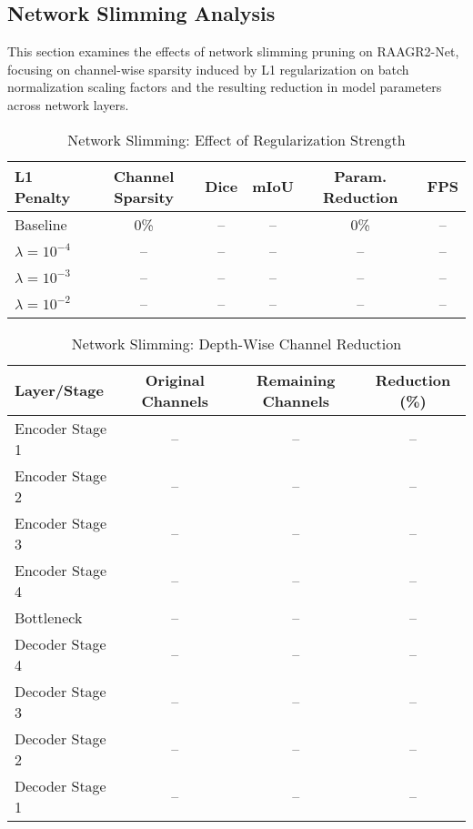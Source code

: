 \documentclass[12pt,a4paper]{article}
\begin{document}
\subsection{Network Slimming Analysis}
This section examines the effects of network slimming pruning on RAAGR2-Net, focusing on channel-wise sparsity induced by L1 regularization on batch normalization scaling factors and the resulting reduction in model parameters across network layers.

\begin{table}[htbp]
\centering
\caption{Network Slimming: Effect of Regularization Strength}
\label{tab:network_slimming_reg}
\begin{adjustbox}{width=\textwidth,center}
\begin{tabular}{lccccc}
\toprule
\textbf{L1 Penalty} & \textbf{Channel Sparsity} & \textbf{Dice} & \textbf{mIoU} & \textbf{Param. Reduction} & \textbf{FPS} \\
\midrule
Baseline & 0\% & -- & -- & 0\% & -- \\
$\lambda=10^{-4}$ & -- & -- & -- & -- & -- \\
$\lambda=10^{-3}$ & -- & -- & -- & -- & -- \\
$\lambda=10^{-2}$ & -- & -- & -- & -- & -- \\
\bottomrule
\end{tabular}
\end{adjustbox}
\end{table}

\begin{table}[htbp]
\centering
\caption{Network Slimming: Depth-Wise Channel Reduction}
\label{tab:slimming_depth_reduction}
\begin{adjustbox}{width=\textwidth,center}
\begin{tabular}{lccc}
\toprule
\textbf{Layer/Stage} & \textbf{Original Channels} & \textbf{Remaining Channels} & \textbf{Reduction (\%)} \\
\midrule
Encoder Stage 1 & -- & -- & -- \\
Encoder Stage 2 & -- & -- & -- \\
Encoder Stage 3 & -- & -- & -- \\
Encoder Stage 4 & -- & -- & -- \\
Bottleneck & -- & -- & -- \\
Decoder Stage 4 & -- & -- & -- \\
Decoder Stage 3 & -- & -- & -- \\
Decoder Stage 2 & -- & -- & -- \\
Decoder Stage 1 & -- & -- & -- \\
\bottomrule
\end{tabular}
\end{adjustbox}
\end{table}
\end{document}
